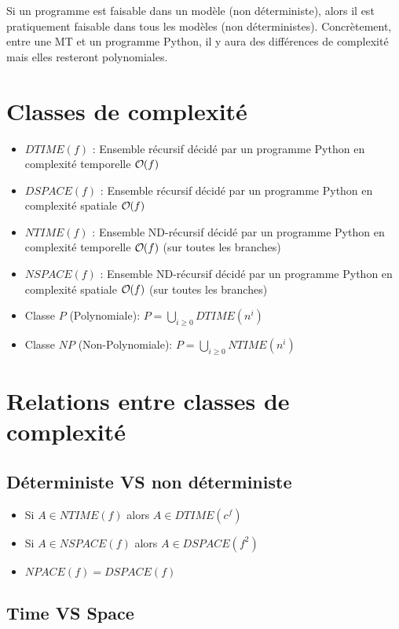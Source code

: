 Si un programme est faisable dans un modèle (non déterministe), alors il est pratiquement faisable dans tous les modèles (non déterministes). Concrètement, entre une MT et un programme Python, il y aura des différences de complexité mais elles resteront polynomiales.

\section{Classes de complexité}

\begin{itemize}
\item $DTIME(f)$ : Ensemble récursif décidé par un programme Python en complexité temporelle $\bigO(f)$
\item $DSPACE(f)$ : Ensemble récursif décidé par un programme Python en complexité spatiale $\bigO(f)$
\item $NTIME(f)$ : Ensemble ND-récursif décidé par un programme Python en complexité temporelle $\bigO(f)$ (sur toutes les branches)
\item $NSPACE(f)$ : Ensemble ND-récursif décidé par un programme Python en complexité spatiale $\bigO(f)$ (sur toutes les branches)
\item Classe $P$ (Polynomiale): $P = \underset{i \geq 0}{\bigcup} DTIME(n^i)$
\item Classe $NP$ (Non-Polynomiale): $P = \underset{i \geq 0}{\bigcup} NTIME(n^i)$
\end{itemize}

\section{Relations entre classes de complexité}

\subsection{Déterministe VS non déterministe}

\begin{itemize}
\item Si $A \in NTIME(f)$ alors $A \in DTIME(c^f)$
\item Si $A \in NSPACE(f)$ alors $A \in DSPACE(f^2)$
\item $NPACE(f) = DSPACE(f)$
\end{itemize}

\subsection{Time VS Space}

